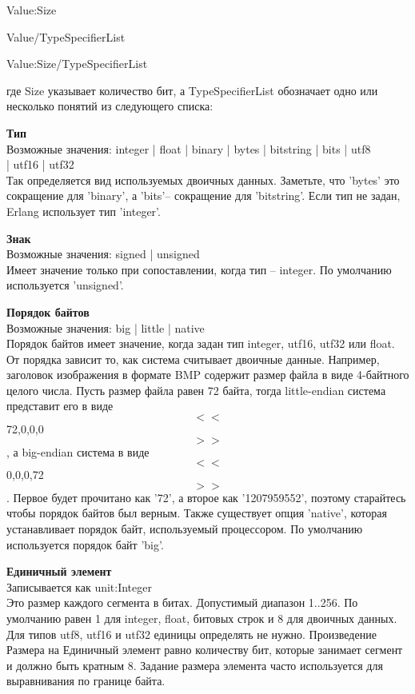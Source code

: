 \documentclass[a4paper,12pt]{report}
\newcommand{\ops}{\colorbox{lgreen}}
\begin{document}
Value:Size

Value/TypeSpecifierList

Value:Size/TypeSpecifierList

где Size указывает количество бит, а TypeSpecifierList обозначает одно или несколько понятий из следующего списка:

\begin{minipage}{\textwidth}
\textbf{Тип}\\ 
Возможные значения: \ops{integer | float | binary | bytes | bitstring | bits | utf8}\\ 
\ops{| utf16 | utf32}\\  
Так определяется вид используемых двоичных данных. Заметьте, что 'bytes' это сокращение для 'binary', а 'bits'\--- сокращение для 'bitstring'. Если тип не задан, Erlang использует тип 'integer'.\\ 
\end{minipage}

\begin{minipage}{\textwidth}
    \textbf{Знак}\\ 
    Возможные значения: \ops{signed | unsigned}\\ 
    Имеет значение только при сопоставлении, когда тип \--- integer. По умолчанию используется 'unsigned'.\\ 
\end{minipage}

\begin{minipage}{\textwidth}
    \textbf{Порядок байтов}\\ 
    Возможные значения: \ops{big | little | native}\\ 
    Порядок байтов имеет значение, когда задан тип integer, utf16, utf32 или float. От порядка зависит то, как система считывает двоичные данные. Например, заголовок изображения в формате BMP содержит размер файла в виде 4\--байтного целого числа. Пусть размер файла равен 72 байта, тогда little\--endian система представит его в виде \ops{$$<<$$72,0,0,0$$>>$$}, а big\--endian система в виде \ops{$$<<$$0,0,0,72$$>>$$}. Первое будет прочитано как '72', а второе как '1207959552', поэтому старайтесь чтобы порядок байтов был верным. Также существует опция 'native', которая устанавливает порядок байт, используемый процессором. По умолчанию используется порядок байт 'big'.\\ 
\end{minipage}

\begin{minipage}{\textwidth}
    \textbf{Единичный элемент}\\ 
    Записывается как \ops{unit:Integer}\\ 
    Это размер каждого сегмента в битах. Допустимый диапазон 1..256. По умолчанию равен 1 для integer, float, битовых строк и 8 для двоичных данных. Для типов utf8, utf16 и utf32 единицы определять не нужно. Произведение Размера на Единичный элемент равно количеству бит, которые занимает сегмент и должно быть кратным 8. Задание размера элемента часто используется для выравнивания по границе байта.\\  
\end{minipage}
\end{document}
